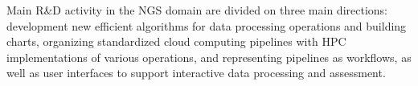 \documentclass[a4paper]{jpconf}
\begin{document}
Main R\&D activity in the NGS domain are divided on three main directions: development new efficient algorithms for data processing operations and building charts, organizing standardized cloud computing pipelines with HPC implementations of various operations, and representing pipelines as workflows, as well as user interfaces to support interactive data processing and assessment.

\end{document}
